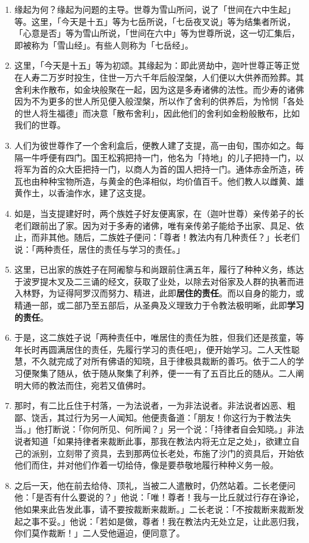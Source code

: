 \begin{enumerate}\item 缘起为何？缘起为问题的主导。世尊为雪山所问，说了「世间在六中生起」等。这里，「今天是十五」等为七岳所说，「七岳夜叉说」等为结集者所说，「心意是否」等为雪山所说，「世间在六中」等为世尊所说，这一切汇集后，即被称为「雪山经」。有些人则称为「七岳经」。
\item 这里，「今天是十五」等为初颂。其缘起为：即此贤劫中，迦叶世尊正等正觉在人寿二万岁时投生，住世一万六千年后般涅槃，人们便以大供养而殓葬。其舍利未作散布，如金块般聚在一起，因为这是多寿诸佛的法性。而少寿的诸佛因为不为更多的世人所见便入般涅槃，所以作了舍利的供养后，为怜悯「各处的世人将生福德」而决意「散布舍利」，因此他们的舍利如金粉般散布，比如我们的世尊。
\item 人们为彼世尊作了一个舍利盒后，便教人建了支提，高一由旬，围亦如之。每隔一牛呼便有四门。国王松鸦把持一门，他名为「持地」的儿子把持一门，以将军为首的众大臣把持一门，以商人为首的国人把持一门。通体赤金所造，砖瓦也由种种宝物所造，与黄金的色泽相似，均价值百千。他们教人以雌黄、雄黄作土，以香油作水，建了这支提。
\item 如是，当支提建好时，两个族姓子好友便离家，在（迦叶世尊）亲传弟子的长老们跟前出了家。因为对于多寿的诸佛，唯有亲传弟子能给予出家、具足、依止，而非其他。随后，二族姓子便问：「尊者！教法内有几种责任？」长老们说：「两种责任，居住的责任与学习的责任。」
\item 这里，已出家的族姓子在阿阇黎与和尚跟前住满五年，履行了种种义务，练达于波罗提木叉及二三诵的经文，获取了业处，以除去对俗家及人群的执著而进入林野，为证得阿罗汉而努力、精进，此即\textbf{居住的责任}。而以自身的能力，或精通一部，或二部乃至五部后，从圣典及义理致力于令教法极明晰，此即\textbf{学习的责任}。
\item 于是，这二族姓子说「两种责任中，唯居住的责任为胜，但我们还是孩童，等年长时再圆满居住的责任，先履行学习的责任吧」，便开始学习。二人天性聪慧，不久就完成了对所有佛语的知晓，且于律极具裁断的善巧。依于二人的学习便聚集了随从，依于随从聚集了利养，便一一有了五百比丘的随从。二人阐明大师的教法而住，宛若又值佛时。
\item 那时，有二比丘住于村落，一为法说者，一为非法说者。非法说者凶恶、粗鄙、饶舌，其过行为另一人闻知。他便责备道：「朋友！你这行为于教法失当。」他打断说：「你何所见、何所闻？」另一个说：「持律者自会知晓。」非法说者知道「如果持律者来裁断此事，那我在教法内将无立足之处」，欲建立自己的派别，立刻带了资具，去到那两位长老处，布施了沙门的资具后，开始依他们而住，并对他们作着一切给侍，像是要恭敬地履行种种义务一般。
\item 之后一天，他在前去给侍、顶礼，当被二人遣散时，仍然站着。二长老便问他：「是否有什么要说的？」他说：「唯！尊者！我与一比丘就过行存在诤论，他如果来此告发此事，请不要按裁断来裁断。」二长老说：「不按裁断来裁断发起之事不妥。」他说：「若如是做，尊者！我在教法内无处立足，让此恶归我，你们莫作裁断！」二人受他逼迫，便同意了。

\end{enumerate}

